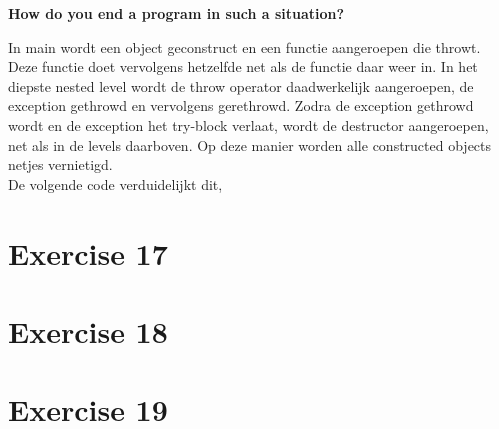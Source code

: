 \documentclass[12pt]{article}
\newcommand{\desc}[1]{\textit{#1} \vspace{1em}}
\begin{document}
\textbf{How do you end a program in such a situation?}

In main wordt een object geconstruct en een functie aangeroepen die throwt. Deze functie doet vervolgens hetzelfde net als de functie daar weer in. In het diepste nested level wordt de throw operator daadwerkelijk aangeroepen, de exception gethrowd en vervolgens gerethrowd. Zodra de exception gethrowd wordt en de exception het try-block verlaat, wordt de destructor aangeroepen, net als in de levels daarboven.
Op deze manier worden alle constructed objects netjes vernietigd.\\

De volgende code verduidelijkt dit,











\clearpage
\section*{Exercise 17}
\desc{}


\clearpage
\section*{Exercise 18}
\desc{}


\clearpage
\section*{Exercise 19}
\desc{}


\clearpage
\end{document}
